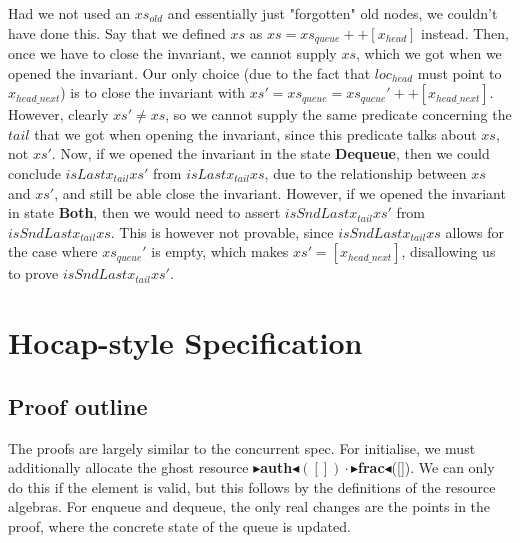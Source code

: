 \documentclass[twoside,11pt,openright]{report}
\newcommand{\DequeueState}{\textbf{Dequeue}}
\newcommand{\BothState}{\textbf{Both}}
\newcommand{\todo}[1]{{\color[rgb]{.5,0,0}\textbf{$\blacktriangleright$#1$\blacktriangleleft$}}}
\begin{document}
Had we not used an $xs_{old}$ and essentially just "forgotten" old nodes, we couldn't have done this. Say that we defined $xs$ as $xs = xs_{queue} ++ [x_{head}]$ instead. Then, once we have to close the invariant, we cannot supply $xs$, which we got when we opened the invariant. Our only choice (due to the fact that $loc_{head}$ must point to $x_{head\_next}$) is to close the invariant with $xs' = xs_{queue} = xs_{queue}' ++ [x_{head\_next}]$. However, clearly $xs' \neq xs$, so we cannot supply the same predicate concerning the $tail$ that we got when opening the invariant, since this predicate talks about $xs$, not $xs'$. Now, if we opened the invariant in the state \DequeueState{}, then we could conclude $isLast x_{tail} xs'$ from $isLast x_{tail} xs$, due to the relationship between $xs$ and $xs'$, and still be able close the invariant. However, if we opened the invariant in state \BothState{}, then we would need to assert $isSndLast x_{tail} xs'$ from $isSndLast x_{tail} xs$. This is however not provable, since $isSndLast x_{tail} xs$ allows for the case where $xs_{queue}'$ is empty, which makes $xs' = [x_{head\_next}]$, disallowing us to prove $isSndLast x_{tail} xs'$.


\section{Hocap-style Specification}


\subsection{Proof outline}
The proofs are largely similar to the concurrent spec. For initialise, we must additionally allocate the ghost resource \todo{auth}$([]) \cdot$\todo{frac}([]). We can only do this if the element is valid, but this follows by the definitions of the resource algebras. For enqueue and dequeue, the only real changes are the points in the proof, where the concrete state of the queue is updated. 
\end{document}
